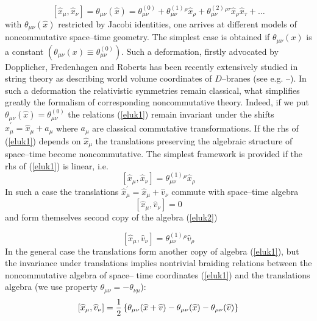 \documentclass[a4paper,12pt]{article}
\begin{document}
\begin{equation}
\label{eluk1}
\left[  \widehat{x}_{\mu}, \widehat{x}_{\nu} \right]
= \theta_{\mu\nu} (\widehat{x} )
=   \theta_{\mu\nu}^{(0)}  +
\theta_{\mu\nu}^{(1)} {}^{\rho}\widehat{x}_{\rho}
+
\theta_{\mu\nu}^{(2)}  {}^{\rho\tau}\widehat{x}_{\rho}
\widehat{x}_{\tau} + \ldots
\end{equation}
with $\theta_{\mu\nu} (\widehat{x} )$ restricted by Jacobi  
identities, one
  arrives at different  models of noncommutative  space--time   
geometry. The
simplest case is obtained if
$\theta_{\mu\nu} ({x} )$ is a constant
$(\theta_{\mu\nu} ({x} )\equiv \theta_{\mu\nu}^{(0)})$. Such
 a deformation, firstly   advocated by Dopplicher, Fredenhagen and 
Roberts
  \cite{rluk1}  
  has been
  recently extensively studied  in string theory as
 describing world volume coordinates of
 $D$--branes (see e.g. \cite{rluk7}--\cite{rluk9}).
 In such a deformation the relativistic symmetries remain classical, 
what simplifies
greatly  the formalism of corresponding noncommutative theory. 
Indeed, if we
 put $\theta_{\mu\nu} (\widehat{x} )= \theta_{\mu\nu}^{(0)}$ the
 relations (\ref{eluk1}) remain invariant under the shifts
 $\widehat{x}^{\prime}_{\mu} = \widehat{x}_{\mu} + a_{\mu}$ where 
$a_{\mu}$ are
 classical commutative transformations. If the rhs of (\ref{eluk1})
 depends on $\widehat{x}_{\mu}$ the translations preserving  the 
algebraic structure
 of space--time become noncommutative. The simplest framework 
is provided if the
 rhs of (\ref{eluk1}) is linear, i.e.
\begin{equation}
\label{eluk2}
\left[  \widehat{x}_{\mu}, \widehat{x}_{\nu} \right]
=
\theta_{\mu\nu}^{(1)}  {}^{\rho}\widehat{x}_{\rho}
\end{equation}
In such a case the translations $\widehat{x}^{\prime}_{\mu} =
\widehat{x}_{\mu} + \widehat{v}_{\nu}$ commute with  space--time 
algebra
\begin{equation}
\label{eluk3} \left[  \widehat{x}_{\mu}, \widehat{v}_{\nu} \right]
= 0
\end{equation}
and form themselves second copy of the algebra (\ref{eluk2})

\begin{equation}
\label{eluk4}
\left[  \widehat{x}_{\mu}, \widehat{v}_{\nu} \right]
=
\theta_{\mu\nu}^{(1)}  {}^{\rho}\widehat{v}_{\rho}
\end{equation}
 In the general case the translations  form another  copy of algebra
 (\ref{eluk1}), but     the invariance under translations implies 
nontrivial
 braiding relations between the noncommutative algebra of space--
time coordinates
 (\ref{eluk1}) and the translations  algebra  (we use property
 $\theta_{\mu\nu}= - \theta_{\nu\mu}$):
\begin{equation}
\label{eluk5}
\left[  \widehat{x}_{\mu}, \widehat{v}_{\nu} \right]
=
{1\over 2}
 \left\{
 \theta_{\mu\nu}(\widehat{x} +\widehat{v})
 - \theta_{\mu\nu}(\widehat{x}) - \theta_{\mu\nu}
 (\widehat{v}) \right\}
\end{equation}
\end{document}
